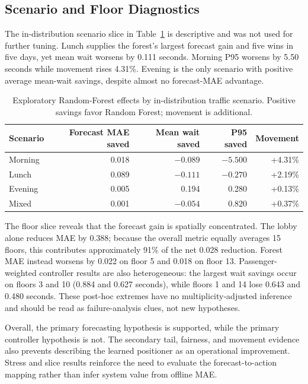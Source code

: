 \documentclass[12pt]{article}
\begin{document}
\subsection{Scenario and Floor Diagnostics}

The in-distribution scenario slice in Table~\ref{tab:final-scenario-slice} is
descriptive and was not used for further tuning. Lunch supplies the forest's
largest forecast gain and five wins in five days, yet mean wait worsens by
0.111 seconds. Morning P95 worsens by 5.50 seconds while movement rises 4.31\%.
Evening is the only scenario with positive average mean-wait savings, despite
almost no forecast-MAE advantage.

\begin{table}[H]
  \centering
  \caption{Exploratory Random-Forest effects by in-distribution traffic
  scenario. Positive savings favor Random Forest; movement is additional.}
  \label{tab:final-scenario-slice}
  \begin{tabular}{@{}lrrrr@{}}
    \toprule
    Scenario & Forecast MAE saved & Mean wait saved & P95 saved & Movement \\
    \midrule
    Morning & 0.018 & $-0.089$ & $-5.500$ & +4.31\% \\
    Lunch & 0.089 & $-0.111$ & $-0.270$ & +2.19\% \\
    Evening & 0.005 & 0.194 & 0.280 & +0.13\% \\
    Mixed & 0.001 & $-0.054$ & 0.820 & +0.37\% \\
    \bottomrule
  \end{tabular}
\end{table}

The floor slice reveals that the forecast gain is spatially concentrated. The
lobby alone reduces MAE by 0.388; because the overall metric equally averages
15 floors, this contributes approximately 91\% of the net 0.028 reduction.
Forest MAE instead worsens by 0.022 on floor 5 and 0.018 on floor 13.
Passenger-weighted controller results are also heterogeneous: the largest wait
savings occur on floors 3 and 10 (0.884 and 0.627 seconds), while floors 1 and
14 lose 0.643 and 0.480 seconds. These post-hoc extremes have no
multiplicity-adjusted inference and should be read as failure-analysis clues,
not new hypotheses.

Overall, the primary forecasting hypothesis is supported, while the primary
controller hypothesis is not. The secondary tail, fairness, and movement
evidence also prevents describing the learned positioner as an operational
improvement. Stress and slice results reinforce the need to evaluate the
forecast-to-action mapping rather than infer system value from offline MAE.
\end{document}
